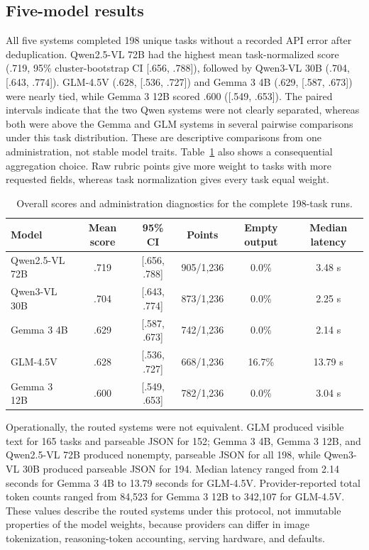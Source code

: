 \documentclass[12pt]{article}
\begin{document}
\subsection{Five-model results}

All five systems completed 198 unique tasks without a recorded API error after deduplication. Qwen2.5-VL 72B had the highest mean task-normalized score (.719, 95\% cluster-bootstrap CI [.656, .788]), followed by Qwen3-VL 30B (.704, [.643, .774]). GLM-4.5V (.628, [.536, .727]) and Gemma 3 4B (.629, [.587, .673]) were nearly tied, while Gemma 3 12B scored .600 ([.549, .653]). The paired intervals indicate that the two Qwen systems were not clearly separated, whereas both were above the Gemma and GLM systems in several pairwise comparisons under this task distribution. These are descriptive comparisons from one administration, not stable model traits. Table~\ref{tab:overall-results} also shows a consequential aggregation choice. Raw rubric points give more weight to tasks with more requested fields, whereas task normalization gives every task equal weight.

\begin{table}[!htbp]
\centering
\small
\caption{Overall scores and administration diagnostics for the complete 198-task runs.}
\label{tab:overall-results}
\begin{tabular}{@{}lccccc@{}}
\toprule
Model & Mean score & 95\% CI & Points & Empty output & Median latency \\
\midrule
Qwen2.5-VL 72B & .719 & [.656, .788] & 905/1,236 & 0.0\% & 3.48 s \\
Qwen3-VL 30B & .704 & [.643, .774] & 873/1,236 & 0.0\% & 2.25 s \\
Gemma 3 4B & .629 & [.587, .673] & 742/1,236 & 0.0\% & 2.14 s \\
GLM-4.5V & .628 & [.536, .727] & 668/1,236 & 16.7\% & 13.79 s \\
Gemma 3 12B & .600 & [.549, .653] & 782/1,236 & 0.0\% & 3.04 s \\
\bottomrule
\end{tabular}
\end{table}

Operationally, the routed systems were not equivalent. GLM produced visible text for 165 tasks and parseable JSON for 152; Gemma 3 4B, Gemma 3 12B, and Qwen2.5-VL 72B produced nonempty, parseable JSON for all 198, while Qwen3-VL 30B produced parseable JSON for 194. Median latency ranged from 2.14 seconds for Gemma 3 4B to 13.79 seconds for GLM-4.5V. Provider-reported total token counts ranged from 84,523 for Gemma 3 12B to 342,107 for GLM-4.5V. These values describe the routed systems under this protocol, not immutable properties of the model weights, because providers can differ in image tokenization, reasoning-token accounting, serving hardware, and defaults.
\end{document}
